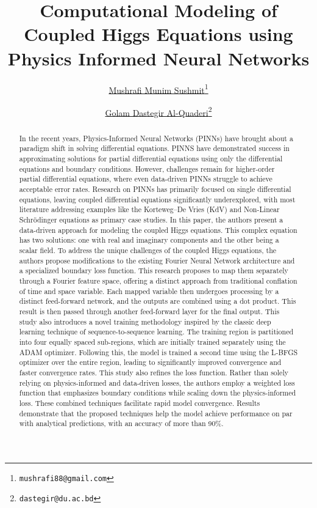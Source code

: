 \documentclass{article}
\title{Computational Modeling of Coupled Higgs Equations using Physics Informed Neural Networks}
\author[1]{%
	\href{https://orcid.org/0009-0003-2515-9464}{\usebox{\orcid}\hspace{1mm}Mushrafi Munim Sushmit\thanks{\texttt{mushrafi88@gmail.com}}}%
}
\author[2]{%
	\href{https://orcid.org/0000-0002-9231-4167}{\usebox{\orcid}\hspace{1mm}Golam Dastegir Al-Quaderi\thanks{\texttt{dastegir@du.ac.bd}}}%
}
\affil[1,2]{Department of Physics, University of Dhaka, Dhaka 1000, Bangladesh}
\begin{document}
\maketitle

\begin{abstract}
% 
In the recent years, Physics-Informed Neural Networks (PINNs) have brought about a paradigm shift in solving differential equations. PINNS have demonstrated success in approximating solutions for partial differential equations using only the differential equations and boundary conditions. However, challenges remain for higher-order partial differential equations, where even data-driven PINNs struggle to achieve acceptable error rates. Research on PINNs has primarily focused on single differential equations, leaving coupled differential equations significantly underexplored, with most literature addressing examples like the Korteweg–De Vries (KdV) and Non-Linear Schrödinger equations as primary case studies. In this paper, the authors present a data-driven approach for modeling the coupled Higgs equations. This complex equation has two solutions: one with real and imaginary components and the other being a scalar field. To address the unique challenges of the coupled Higgs equations, the authors propose modifications to the existing Fourier Neural Network architecture and a specialized boundary loss function. This research proposes to map them separately through a Fourier feature space, offering a distinct approach from traditional conflation of time and space variable. Each mapped variable then undergoes processing by a distinct feed-forward network, and the outputs are combined using a dot product. This result is then passed through another feed-forward layer for the final output. This study also introduces a novel training methodology inspired by the classic deep learning technique of sequence-to-sequence learning. The training region is partitioned into four equally spaced sub-regions, which are initially trained separately using the ADAM optimizer.  Following this, the model is trained a second time using the L-BFGS optimizer over the entire region, leading to significantly improved convergence and faster convergence rates. This study also refines the loss function. Rather than solely relying on physics-informed and data-driven losses, the authors employ a weighted loss function that emphasizes boundary conditions while scaling down the physics-informed loss. These combined techniques facilitate rapid model convergence. Results demonstrate that the proposed techniques help the model achieve performance on par with analytical predictions, with an accuracy of more than 90\%.
\end{abstract}

 



% 
%  
\end{document}
